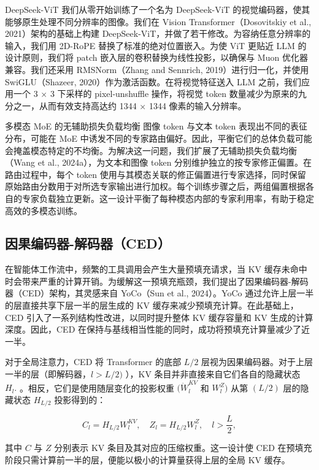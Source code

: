 \documentclass[
  10
]{article}
\begin{document}
DeepSeek-ViT 我们从零开始训练了一个名为 DeepSeek-ViT 的视觉编码器，使其能够原生处理不同分辨率的图像。我们在 Vision Transformer（Dosovitskiy et al., 2021）架构的基础上构建 DeepSeek-ViT，并做了若干修改。为容纳任意分辨率的输入，我们用 2D-RoPE 替换了标准的绝对位置嵌入。为使 ViT 更贴近 LLM 的设计原则，我们将 patch 嵌入层的卷积替换为线性投影，以确保与 Muon 优化器兼容。我们还采用 RMSNorm（Zhang and Sennrich, 2019）进行归一化，并使用 SwiGLU（Shazeer, 2020）作为激活函数。在将视觉特征送入 LLM 之前，我们应用一个 3 $\times$ 3 下采样的 pixel-unshuffle 操作，将视觉 token 数量减少为原来的九分之一，从而有效支持高达约 1344 $\times$ 1344 像素的输入分辨率。

多模态 MoE 的无辅助损失负载均衡 图像 token 与文本 token 表现出不同的表征分布，可能在 MoE 中诱发不同的专家路由偏好。因此，平衡它们的总体负载可能会掩盖模态特定的不均衡。为解决这一问题，我们扩展了无辅助损失负载均衡（Wang et al., 2024a），为文本和图像 token 分别维护独立的按专家修正偏置。在路由过程中，每个 token 使用与其模态关联的修正偏置进行专家选择，同时保留原始路由分数用于对所选专家输出进行加权。每个训练步骤之后，两组偏置根据各自的专家负载独立更新。这一设计平衡了每种模态内部的专家利用率，有助于稳定高效的多模态训练。



\subsection{因果编码器-解码器（CED）}\label{causal-encoder-decoder-ced}

在智能体工作流中，频繁的工具调用会产生大量预填充请求，当 KV 缓存未命中时会带来严重的计算开销。为缓解这一预填充瓶颈，我们提出了因果编码器-解码器（CED）架构，其灵感来自 YoCo（Sun et al., 2024）。YoCo 通过允许上层一半的层直接共享下层一半的层生成的 KV 缓存来减少预填充计算。在此基础上，CED 引入了一系列结构性改进，以同时提升整体 KV 缓存容量和 KV 生成的计算深度。因此，CED 在保持与基线相当性能的同时，成功将预填充计算量减少了近一半。

对于全局注意力，CED 将 Transformer 的底部 \(L / 2\) 层视为因果编码器。对于上层一半的层（即解码器，\(l > L / 2 )\) ），KV 条目并非直接来自它们各自的隐藏状态 \(H _ { l } .\) 。相反，它们是使用随层变化的投影权重 \(( \dot { W } _ { l } ^ { K V }\) 和 \(W _ { l } ^ { Z } )\) 从第 \(( L / 2 )\) 层的隐藏状态 \(H _ { L / 2 }\) 投影得到的：

\[
C _ { l } = H _ { L / 2 } W _ { l } ^ { K V } , \quad Z _ { l } = H _ { L / 2 } W _ { l } ^ { Z } , \quad l > \frac { L } { 2 } ,\tag{1}
\]

其中 $C$ 与 $Z$ 分别表示 KV 条目及其对应的压缩权重。这一设计使 CED 在预填充阶段只需计算前一半的层，便能以极小的计算量获得上层的全局 KV 缓存。
\end{document}
